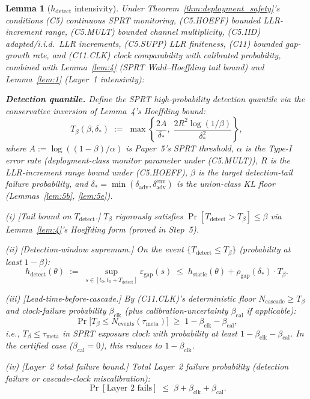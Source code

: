 \documentclass{article}
\newtheorem{lemma}{Lemma}
\newcommand{\deltaadv}{\delta_{\mathrm{adv}}}
\newcommand{\deltastar}{\delta_{*}}
\newcommand{\rhogap}{\rho_{\mathrm{gap}}}
\newcommand{\epsgap}{\varepsilon_{\mathrm{gap}}}
\newcommand{\Tbeta}{T_{\beta}}
\newcommand{\Ncasc}{N_{\mathrm{cascade}}}
\newcommand{\Nev}{N_{\mathrm{events}}}
\newcommand{\bclk}{\beta_{\mathrm{clk}}}
\newcommand{\bcal}{\beta_{\mathrm{cal}}}
\begin{document}
\begin{lemma}[$h_{\mathrm{detect}}$ intensivity]
\label{lem:6}
Under Theorem~\ref{thm:deployment_safety}'s conditions (C5)
continuous SPRT monitoring, (C5.HOEFF) bounded LLR-increment range,
(C5.MULT) bounded channel multiplicity, (C5.IID) adapted/i.i.d.\
LLR increments, (C5.SUPP) LLR finiteness, (C11) bounded gap-growth
rate, and (C11.CLK) clock comparability with calibrated
probability, combined with Lemma~\ref{lem:4} (SPRT Wald--Hoeffding
tail bound) and Lemma~\ref{lem:1} (Layer~1 intensivity):

\textbf{Detection quantile.}  Define the SPRT high-probability
detection quantile via the conservative inversion of Lemma~4's
Hoeffding bound:
\[
  \Tbeta(\beta, \deltastar) \;:=\;
  \max\!\left\{\frac{2A}{\deltastar},\;
  \frac{2 R^2 \log(1/\beta)}{\deltastar^2}\right\},
\]
where $A := \log((1-\beta)/\alpha)$ is Paper~5's SPRT threshold,
$\alpha$ is the Type-I error rate (deployment-class monitor
parameter under (C5.MULT)), $R$ is the LLR-increment range bound
under (C5.HOEFF), $\beta$ is the target detection-tail failure
probability, and $\deltastar = \min(\deltaadv,
\delta_{\mathrm{adv}}^{\mathrm{env}})$ is the union-class KL floor
(Lemmas~\ref{lem:5b}, \ref{lem:5e}).

(i) [Tail bound on $T_{\mathrm{detect}}$.]  $\Tbeta$ rigorously
satisfies $\Pr[T_{\mathrm{detect}} > \Tbeta] \leq \beta$ via
Lemma~\ref{lem:4}'s Hoeffding form (proved in Step~5).

(ii) [Detection-window supremum.]  On the event
$\{T_{\mathrm{detect}} \leq \Tbeta\}$ (probability at least
$1-\beta$):
\[
  h_{\mathrm{detect}}(\theta) \;:=\;
  \sup_{s \in [t_0, t_0 + T_{\mathrm{detect}}]} \epsgap(s)
  \;\leq\; h_{\mathrm{static}}(\theta) + \rhogap(\deltastar) \cdot
  \Tbeta.
\]

(iii) [Lead-time-before-cascade.]  By (C11.CLK)'s deterministic
floor $\Ncasc \geq \Tbeta$ and clock-failure probability $\bclk$
(plus calibration-uncertainty $\bcal$ if applicable):
\[
  \Pr\bigl[\Tbeta \leq \Nev(\tau_{\mathrm{meta}})\bigr] \;\geq\; 1 -
  \bclk - \bcal,
\]
i.e., $\Tbeta \leq \tau_{\mathrm{meta}}$ in SPRT exposure clock
with probability at least $1 - \bclk - \bcal$.  In the certified
case ($\bcal = 0$), this reduces to $1 - \bclk$.

(iv) [Layer~2 total failure bound.]  Total Layer~2 failure
probability (detection failure or cascade-clock miscalibration):
\[
  \Pr[\text{Layer~2 fails}] \;\leq\; \beta + \bclk + \bcal.
\]


\end{lemma}
\end{document}
